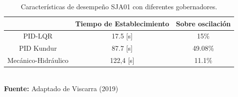 \begin{table}[h]
	\begin{center}
		\caption{Características de desempeño SJA01 con diferentes gobernadores.}
		\label{tab:tabla1}
		\begin{tabular}{c c c}
			\hline
			           & \textbf{Tiempo de Establecimiento} & \textbf{Sobre oscilación} \\ \hline
			PID-LQR    & 17.5 [s] & 15\%  \\
			PID Kundur & 87.7 [s] & 49.08\% \\
			Mecánico-Hidráulico & 122,4 [s] & 11.1\%  \\
			\hline
		\end{tabular}\\[0.5cm]
		\footnotesize{\textbf{Fuente:} Adaptado de Viscarra (2019)}
	\end{center}
\end{table}
